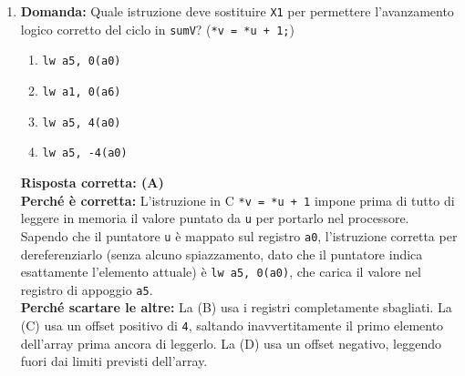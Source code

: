 \documentclass[12pt, a4paper]{article}
\begin{document}
\begin{enumerate}
    \item \textbf{Domanda:} Quale istruzione deve sostituire \texttt{X1} per permettere l'avanzamento logico corretto del ciclo in \texttt{sumV}? (\texttt{*v = *u + 1;})
    \begin{enumerate}[label=(\Alph*)]
        \item \texttt{lw a5, 0(a0)}
        \item \texttt{lw a1, 0(a6)}
        \item \texttt{lw a5, 4(a0)}
        \item \texttt{lw a5, -4(a0)}
    \end{enumerate}
    \textbf{Risposta corretta: (A)} \\
    \textbf{Perché è corretta:} L'istruzione in C \texttt{*v = *u + 1} impone prima di tutto di leggere in memoria il valore puntato da \texttt{u} per portarlo nel processore. Sapendo che il puntatore \texttt{u} è mappato sul registro \texttt{a0}, l'istruzione corretta per dereferenziarlo (senza alcuno spiazzamento, dato che il puntatore indica esattamente l'elemento attuale) è \texttt{lw a5, 0(a0)}, che carica il valore nel registro di appoggio \texttt{a5}. \\
    \textbf{Perché scartare le altre:} La (B) usa i registri completamente sbagliati. La (C) usa un offset positivo di \texttt{4}, saltando inavvertitamente il primo elemento dell'array prima ancora di leggerlo. La (D) usa un offset negativo, leggendo fuori dai limiti previsti dell'array.


\end{enumerate}
\end{document}
